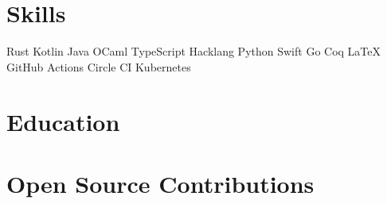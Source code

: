 \documentclass[]{res}
\begin{document}

\section{Skills}

\sectionsep

Rust \textbullet{} Kotlin \textbullet{} Java \textbullet{} OCaml \textbullet{} TypeScript \textbullet{} Hacklang \textbullet{} Python \textbullet{} Swift \textbullet{} Go \textbullet{} Coq \textbullet{} \LaTeX \\
GitHub Actions \textbullet{} Circle CI \textbullet{} Kubernetes
\sectionsep


\section{Education}

\sectionsep

\sectionsep


\section{Open Source Contributions}

\sectionsep

\href{https://github.com/facebook/docusaurus}{} \textbullet{}
\href{https://github.com/facebook/flow}{} \textbullet{}
\href{https://github.com/facebook/react}{} \textbullet{}
\href{https://github.com/facebook/jest}{} \textbullet{}
\href{https://github.com/facebook/pyre-check}{} \textbullet{}
\href{https://github.com/yarnpkg/berry}{}
\end{document}
